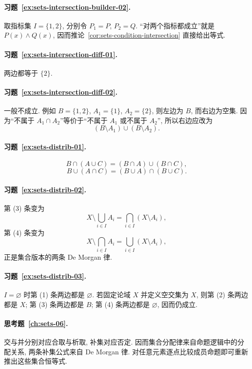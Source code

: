 \documentclass[usesamecnt, thmcnt=section, lang=cn, newtx, 10pt, scheme=chinese]{elegantbook}
\begin{document}
\paragraph*{习题~\ref{ex:sets-intersection-builder-02}.}
取指标集 $I=\{1,2\}$, 分别令 $P_1=P$, $P_2=Q$. ``对两个指标都成立''就是 $P(x)\wedge Q(x)$, 因而推论~\ref{cor:sets-condition-intersection} 直接给出等式.

\paragraph*{习题~\ref{ex:sets-intersection-diff-01}.}
两边都等于 $\{2\}$.

\paragraph*{习题~\ref{ex:sets-intersection-diff-02}.}
一般不成立. 例如 $B=\{1,2\}$, $A_1=\{1\}$, $A_2=\{2\}$, 则左边为 $B$, 而右边为空集. 因为``不属于 $A_1\cap A_2$''等价于``不属于 $A_1$ 或不属于 $A_2$'', 所以右边应改为
\[
 (B\setminus A_1)\cup(B\setminus A_2).
\]

\paragraph*{习题~\ref{ex:sets-distrib-01}.}
\[
 B\cap(A\cup C)=(B\cap A)\cup(B\cap C),
\]
\[
 B\cup(A\cap C)=(B\cup A)\cap(B\cup C).
\]

\paragraph*{习题~\ref{ex:sets-distrib-02}.}
第 (3) 条变为
\[
 X\setminus\bigcup_{i\in I}A_i=\bigcap_{i\in I}(X\setminus A_i),
\]
第 (4) 条变为
\[
 X\setminus\bigcap_{i\in I}A_i=\bigcup_{i\in I}(X\setminus A_i),
\]
正是集合版本的两条 De Morgan 律.

\paragraph*{习题~\ref{ex:sets-distrib-03}.}
$I=\varnothing$ 时第 (1) 条两边都是 $\varnothing$. 若固定论域 $X$ 并定义空交集为 $X$, 则第 (2) 条两边都是 $X$; 第 (3) 条两边都是 $B$; 第 (4) 条两边都是 $\varnothing$, 因而仍成立.

\paragraph*{思考题~\ref{ch:sets-06}.}
交与并分别对应合取与析取, 补集对应否定. 因而集合分配律来自命题逻辑中的分配关系, 两条补集公式来自 De Morgan 律. 对任意元素逐点比较成员命题即可重新推出这些集合恒等式.
\end{document}
